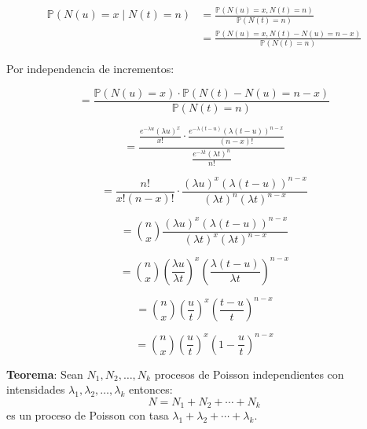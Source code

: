 \documentclass[12pt,a4paper]{article}
\newcommand{\teorema}[1]{%
\begin{teoremabox}
\textbf{Teorema}: #1
\end{teoremabox}
}
\begin{document}
\begin{align*}
\mathbb{P}(N(u) = x \mid N(t) = n) &= \frac{\mathbb{P}(N(u) = x, N(t) = n)}{\mathbb{P}(N(t) = n)} \\
&= \frac{\mathbb{P}(N(u) = x, N(t) - N(u) = n - x)}{\mathbb{P}(N(t) = n)}
\end{align*}

Por independencia de incrementos:

\begin{equation*}
= \frac{\mathbb{P}(N(u) = x) \cdot \mathbb{P}(N(t) - N(u) = n - x)}{\mathbb{P}(N(t) = n)}
\end{equation*}

\begin{equation*}
= \frac{\frac{e^{-\lambda u} (\lambda u)^x}{x!} \cdot \frac{e^{-\lambda(t-u)} (\lambda(t-u))^{n-x}}{(n-x)!}}{\frac{e^{-\lambda t} (\lambda t)^n}{n!}}
\end{equation*}

\begin{equation*}
= \frac{n!}{x!(n-x)!} \cdot \frac{(\lambda u)^x (\lambda(t-u))^{n-x}}{(\lambda t)^n (\lambda t)^{n-x}}
\end{equation*}

\begin{equation*}
= \binom{n}{x} \frac{(\lambda u)^x (\lambda(t-u))^{n-x}}{(\lambda t)^x (\lambda t)^{n-x}}
\end{equation*}

\begin{equation*}
= \binom{n}{x} \left(\frac{\lambda u}{\lambda t}\right)^x \left(\frac{\lambda(t-u)}{\lambda t}\right)^{n-x}
\end{equation*}

\begin{equation*}
= \binom{n}{x} \left(\frac{u}{t}\right)^x \left(\frac{t-u}{t}\right)^{n-x}
\end{equation*}

\begin{equation*}
= \binom{n}{x} \left(\frac{u}{t}\right)^x \left(1 - \frac{u}{t}\right)^{n-x}
\end{equation*}

\teorema{Sean $N_1, N_2, \ldots, N_k$ procesos de Poisson independientes con intensidades $\lambda_1, \lambda_2, \ldots, \lambda_k$ entonces:
\begin{equation*}
N = N_1 + N_2 + \cdots + N_k
\end{equation*}
es un proceso de Poisson con tasa $\lambda_1 + \lambda_2 + \cdots + \lambda_k$.}
\end{document}
